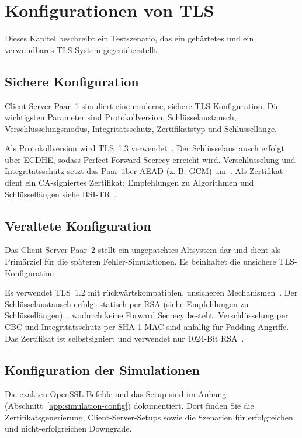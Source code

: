 \section{Konfigurationen von TLS}
Dieses Kapitel beschreibt ein Testszenario, das ein gehärtetes und ein verwundbares TLS-System gegenüberstellt. 

\subsection{Sichere Konfiguration}
Client-Server-Paar~1 simuliert eine moderne, sichere TLS-Konfiguration. Die wichtigsten Parameter sind Protokollversion, Schlüsselaustausch, Verschlüsselungsmodus, Integritätsschutz, Zertifikatstyp und Schlüssellänge.

Als Protokollversion wird TLS~1.3 verwendet~\cite{rfc8446}. Der Schlüsselaustausch erfolgt über ECDHE, sodass Perfect Forward Secrecy erreicht wird. Verschlüsselung und Integritätsschutz setzt das Paar über AEAD (z. B. GCM) um~\cite{rfc8446}. Als Zertifikat dient ein CA-signiertes Zertifikat; Empfehlungen zu Algorithmen und Schlüssellängen siehe BSI-TR~\cite{bsi-tr02102}.

\subsection{Veraltete Konfiguration}
Das Client-Server-Paar~2 stellt ein ungepatchtes Altsystem dar und dient als Primärziel für die späteren Fehler-Simulationen. Es beinhaltet die unsichere TLS-Konfiguration.

Es verwendet TLS~1.2 mit rückwärtskompatiblen, unsicheren Mechanismen~\cite{rfc8996}. Der Schlüsselaustausch erfolgt statisch per RSA (siehe Empfehlungen zu Schlüssellängen)~\cite{bsi-tr02102}, wodurch keine Forward Secrecy besteht. Verschlüsselung per CBC und Integritätsschutz per SHA-1 MAC sind anfällig für Padding-Angriffe. Das Zertifikat ist selbstsigniert und verwendet nur 1024-Bit RSA~\cite{bsi-tr02102}.

\subsection{Konfiguration der Simulationen}

Die exakten OpenSSL-Befehle und das Setup sind im Anhang (Abschnitt~\ref{app:simulation-config}) dokumentiert. Dort finden Sie die Zertifikatsgenerierung, Client-Server-Setups sowie die Szenarien für erfolgreichen und nicht-erfolgreichen Downgrade.